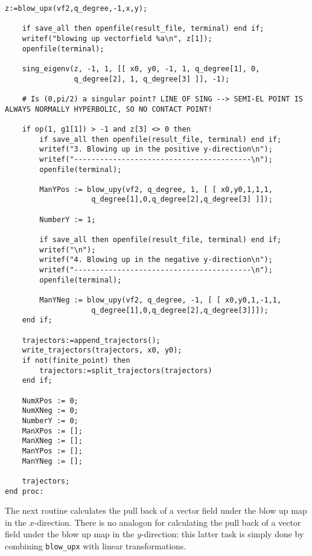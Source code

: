 \documentclass[a4paper,10pt]{article}
\begin{document}
\begin{lstlisting}[name=blowup]
    z:=blow_upx(vf2,q_degree,-1,x,y);

    if save_all then openfile(result_file, terminal) end if;
    writef("blowing up vectorfield %a\n", z[1]);
    openfile(terminal);

    sing_eigenv(z, -1, 1, [[ x0, y0, -1, 1, q_degree[1], 0,
                q_degree[2], 1, q_degree[3] ]], -1);

    # Is (0,pi/2) a singular point? LINE OF SING --> SEMI-EL POINT IS ALWAYS NORMALLY HYPERBOLIC, SO NO CONTACT POINT!

    if op(1, g1[1]) > -1 and z[3] <> 0 then
        if save_all then openfile(result_file, terminal) end if;
        writef("3. Blowing up in the positive y-direction\n");
        writef("-----------------------------------------\n");
        openfile(terminal);

        ManYPos := blow_upy(vf2, q_degree, 1, [ [ x0,y0,1,1,1,
                    q_degree[1],0,q_degree[2],q_degree[3] ]]);

        NumberY := 1;

        if save_all then openfile(result_file, terminal) end if;
        writef("\n");
        writef("4. Blowing up in the negative y-direction\n");
        writef("-----------------------------------------\n");
        openfile(terminal);

        ManYNeg := blow_upy(vf2, q_degree, -1, [ [ x0,y0,1,-1,1,
                    q_degree[1],0,q_degree[2],q_degree[3]]]);
    end if;

    trajectors:=append_trajectors();
    write_trajectors(trajectors, x0, y0);
    if not(finite_point) then
        trajectors:=split_trajectors(trajectors)
    end if;

    NumXPos := 0;
    NumXNeg := 0;
    NumberY := 0;
    ManXPos := [];
    ManXNeg := [];
    ManYPos := [];
    ManYNeg := [];

    trajectors;
end proc:
\end{lstlisting}

The next routine calculates the pull back of a vector field under the blow up map in the $x$-direction.
There is no analogon for calculating the pull back of a vector field under the blow up map in the $y$-direction:
this latter task is simply done by combining \verb+blow_upx+ with linear transformations.
\end{document}
